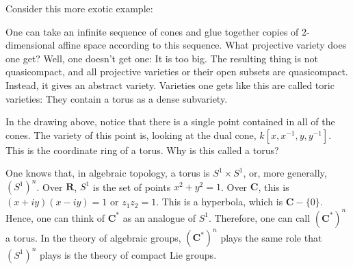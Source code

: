\documentclass[11pt, oneside,margin=1in]{article}
\begin{document}
Consider this more exotic example:
\begin{center}
\end{center}
One can take an infinite sequence of cones and glue together copies of $2$-dimensional affine space according to this sequence. What projective variety does one get? Well, one doesn't get one: It is too big. The resulting thing is not quasicompact, and all projective varieties or their open subsets are quasicompact. Instead, it gives an abstract variety. Varieties one gets like this are called toric varieties: They contain a torus as a dense subvariety.

In the drawing above, notice that there is a single point contained in all of the cones. The variety of this point is, looking at the dual cone, $k[x,x^{-1},y,y^{-1}]$. This is the coordinate ring of a torus. Why is this called a torus?

One knows that, in algebraic topology, a torus is $S^1\times S^1$, or, more generally, $(S^1)^n$. Over $\mathbf{R}$, $S^1$ is the set of points $x^2 + y^2 = 1$. Over $\mathbf{C}$, this is $(x+iy) (x-iy)=1$ or $z_1z_2=1$. This is a hyperbola, which is $\mathbf{C}-\{0\}$. Hence, one can think of $\mathbf{C}^*$ as an analogue of $S^1$. Therefore, one can call $(\mathbf{C}^*)^n$ a torus. In the theory of algebraic groups, $(\mathbf{C}^*)^n$ plays the same role that $(S^1)^n$ plays is the theory of compact Lie groups. 
\end{document}
